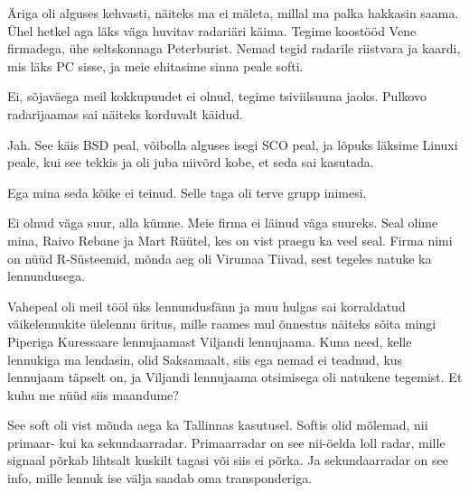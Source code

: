 
Äriga oli alguses kehvasti, näiteks ma ei mäleta, millal ma palka 
hakkasin saama. Ühel hetkel aga läks väga huvitav radariäri käima. Tegime koostööd Vene firmadega, 
ühe seltskonnaga Peterburist. Nemad tegid radarile riistvara ja kaardi, 
mis läks PC sisse, ja meie ehitasime sinna peale softi.


Ei, sõjaväega meil kokkupuudet ei olnud, tegime tsiviilsuuna jaoks. Pulkovo 
radarijaamas sai näiteks korduvalt käidud.


Jah. See käis BSD peal, 
võibolla alguses isegi SCO peal, ja 
lõpuks läksime Linuxi peale, kui see tekkis ja oli juba niivõrd 
kobe, et seda sai kasutada.


Ega mina seda kõike ei teinud. Selle taga oli terve grupp inimesi.


Ei olnud väga suur, alla kümne. Meie firma ei läinud väga suureks. 
Seal olime mina, Raivo Rebane ja Mart 
Rüütel, kes on vist praegu ka veel seal. Firma nimi 
on nüüd R-Süsteemid, mõnda aeg oli Virumaa 
Tiivad, sest tegeles natuke ka 
lennundusega. 

Vahepeal oli meil tööl üks lennundusfänn ja muu hulgas sai 
korraldatud väikelennukite ülelennu üritus, mille raames mul 
õnnestus näiteks sõita mingi Piperiga Kuressaare lennujaamast Viljandi lennujaama. Kuna need, kelle lennukiga ma lendasin, olid Saksamaalt, siis 
ega nemad ei teadnud, kus lennujaam täpselt on, ja Viljandi 
lennujaama otsimisega oli natukene tegemist. Et kuhu me nüüd siis 
maandume?


See soft oli vist mõnda aega ka Tallinnas kasutusel. Softis olid mõlemad, nii 
primaar- kui ka sekundaarradar. Primaarradar on see nii-öelda loll radar, 
mille signaal põrkab lihtsalt kuskilt tagasi või siis ei põrka. Ja 
sekundaarradar on see info, mille lennuk ise välja saadab oma 
transponderiga.

